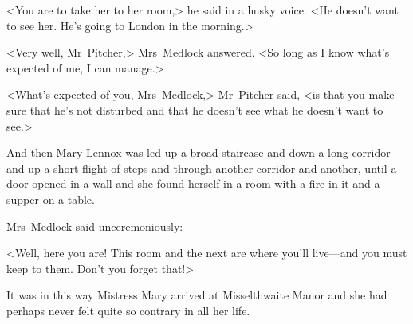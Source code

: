 <You are to take her to her room,> he said in a husky voice. <He doesn't want to see her. He's going to London in the morning.>

<Very well, Mr~Pitcher,> Mrs~Medlock answered. <So long as I know what's expected of me, I can manage.>

<What's expected of you, Mrs~Medlock,> Mr~Pitcher said, <is that you make sure that he's not disturbed and that he doesn't see what he doesn't want to see.>

And then Mary Lennox was led up a broad staircase and down a long corridor and up a short flight of steps and through another corridor and another, until a door opened in a wall and she found herself in a room with a fire in it and a supper on a table.

Mrs~Medlock said unceremoniously:

<Well, here you are! This room and the next are where you'll live—and you must keep to them. Don't you forget that!>

It was in this way Mistress Mary arrived at Misselthwaite Manor and she had perhaps never felt quite so contrary in all her life.

